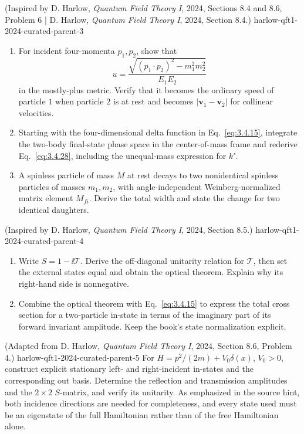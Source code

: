\begin{enumerate}
  {(Inspired by D. Harlow, \emph{Quantum Field Theory I}, 2024, Sections 8.4 and 8.6, Problem 6 | D. Harlow, \emph{Quantum Field Theory I}, 2024, Section 8.4.)}
  {harlow-qft1-2024-curated-parent-3}
\begin{enumerate}
\item
For incident four-momenta \(p_1,p_2\), show that
\[
 u=\frac{\sqrt{(p_1\cdot p_2)^2-m_1^2m_2^2}}{E_1E_2}
\]
in the mostly-plus metric.  Verify that it becomes the ordinary speed of
particle \(1\) when particle \(2\) is at rest and becomes
\(|\mathbf v_1-\mathbf v_2|\) for collinear velocities.
\item
Starting with the four-dimensional delta function in
Eq.~\eqref{eq:3.4.15}, integrate the two-body final-state phase space in
the center-of-mass frame and rederive Eq.~\eqref{eq:3.4.28}, including
the unequal-mass expression for \(k'\).
\item
A spinless particle of mass \(M\) at rest decays to two nonidentical
spinless particles of masses \(m_1,m_2\), with angle-independent
Weinberg-normalized matrix element \(M_{fi}\).  Derive the total width and
state the change for two identical daughters.
\end{enumerate}

  {(Inspired by D. Harlow, \emph{Quantum Field Theory I}, 2024, Section 8.5.)}
  {harlow-qft1-2024-curated-parent-4}
\begin{enumerate}
\item
Write \(S=1-\ii\mathcal T\).  Derive the off-diagonal unitarity relation for
\(\mathcal T\), then set the external states equal and obtain the optical
theorem.  Explain why its right-hand side is nonnegative.
\item
Combine the optical theorem with Eq.~\eqref{eq:3.4.15} to express the
total cross section for a two-particle in-state in terms of the imaginary
part of its forward invariant amplitude.  Keep the book's state
normalization explicit.
\end{enumerate}

  {(Adapted from D. Harlow, \emph{Quantum Field Theory I}, 2024, Section 8.6, Problem 4.)}
  {harlow-qft1-2024-curated-parent-5}
For \(H=p^2/(2m)+V_0\delta(x)\), \(V_0>0\), construct explicit stationary
left- and right-incident in-states and the corresponding out basis.
Determine the reflection and transmission amplitudes and the \(2\times2\)
\(S\)-matrix, and verify its unitarity.  As emphasized in the source hint,
both incidence directions are needed for completeness, and every state
used must be an eigenstate of the full Hamiltonian rather than of the free
Hamiltonian alone.


\end{enumerate}

